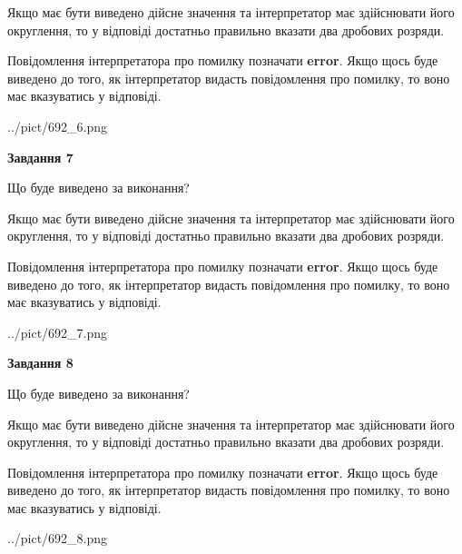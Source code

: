 \documentclass[12pt, ukrainian]{article}
\begin{document}
{\begin {Large}
Якщо має бути виведено дійсне значення та інтерпретатор має здійснювати його округлення, 
то у відповіді достатньо правильно вказати два дробових розряди.

Повідомлення інтерпретатора про помилку позначати \textbf{error}.
Якщо щось буде виведено до того, як інтерпретатор видасть повідомлення про помилку, 
то воно має вказуватись у відповіді. \par

\begin{center}
	{../pict/692_6.png}
\end{center}
\newpage

{\begin {center}\textbf{Завдання 7}\end {center}}\par
Що буде виведено за виконання? \par

Якщо має бути виведено дійсне значення та інтерпретатор має здійснювати його округлення, 
то у відповіді достатньо правильно вказати два дробових розряди.

Повідомлення інтерпретатора про помилку позначати \textbf{error}.
Якщо щось буде виведено до того, як інтерпретатор видасть повідомлення про помилку, 
то воно має вказуватись у відповіді. \par

\begin{center}
	{../pict/692_7.png}
\end{center}
\newpage

{\begin {center}\textbf{Завдання 8}\end {center}}\par
Що буде виведено за виконання? \par

Якщо має бути виведено дійсне значення та інтерпретатор має здійснювати його округлення, 
то у відповіді достатньо правильно вказати два дробових розряди.

Повідомлення інтерпретатора про помилку позначати \textbf{error}.
Якщо щось буде виведено до того, як інтерпретатор видасть повідомлення про помилку, 
то воно має вказуватись у відповіді. \par

\begin{center}
	{../pict/692_8.png}
\end{center}
\newpage


\end{Large}}
\end{document}
